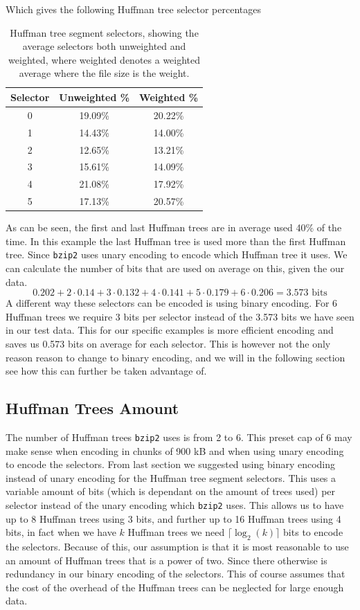 \documentclass{article}
\begin{document}
Which gives the following Huffman tree selector percentages
\begin{table}[H]
    \centering
    \begin{tabular}{|c|c|c|}
         \hline
         Selector & Unweighted \% & Weighted \% \\ \hline
            0 &	19.09\%	 & 20.22\% \\ \hline
            1 &	14.43\% &	14.00\% \\ \hline
            2 &	12.65\% &	13.21\% \\ \hline
            3 &	15.61\%	& 14.09\% \\ \hline
            4 &	21.08\% &	17.92\% \\ \hline
            5 &	17.13\% &	20.57\% \\ \hline
    \end{tabular}
    \caption{Huffman tree segment selectors, showing the average selectors both unweighted and weighted, where weighted denotes a weighted average where the file size is the weight.}
\end{table}
As can be seen, the first and last Huffman trees are in average used 40\% of the time. In this example the last Huffman tree is used more than the first Huffman tree. Since \texttt{bzip2} uses unary encoding to encode which Huffman tree it uses. We can calculate the number of bits that are used on average on this, given the our data.
\[
    0.202 + 2 \cdot 0.14 + 3 \cdot 0.132 + 4 \cdot 0.141 + 5 \cdot 0.179 + 6 \cdot 0.206 = 3.573 \text{ bits}
\]
A different way these selectors can be encoded is using binary encoding. For 6 Huffman trees we require 3 bits per selector instead of the 3.573 bits we have seen in our test data. This for our specific examples is more efficient encoding and saves us 0.573 bits on average for each selector. This is however not the only reason reason to change to binary encoding, and we will in the following section see how this can further be taken advantage of.

\subsection{Huffman Trees Amount}\label{HuffmanTreesCount}
The number of Huffman trees \texttt{bzip2} uses is from 2 to 6. This preset cap of 6 may make sense when encoding in chunks of 900 kB and when using unary encoding to encode the selectors. From last section we suggested using binary encoding instead of unary encoding for the Huffman tree segment selectors. This uses a variable amount of bits (which is dependant on the amount of trees used) per selector instead of the unary encoding which \texttt{bzip2} uses.
This allows us to have up to 8 Huffman trees using 3 bits, and further up to 16 Huffman trees using 4 bits, in fact when we have \(k\) Huffman trees we need \(\lceil\log_2{(k)}\rceil\) bits to encode the selectors.
Because of this, our assumption is that it is most reasonable to use an amount of Huffman trees that is a power of two. Since there otherwise is redundancy in our binary encoding of the selectors.
This of course assumes that the cost of the overhead of the Huffman trees can be neglected for large enough data.
\end{document}
